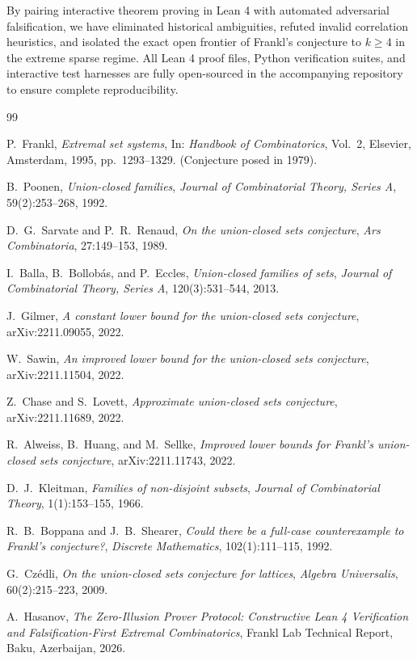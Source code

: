\documentclass[11pt,a4paper]{article}
\theoremstyle{plain}
\theoremstyle{definition}
\theoremstyle{remark}
\begin{document}
By pairing interactive theorem proving in Lean 4 with automated adversarial falsification, we have eliminated historical ambiguities, refuted invalid correlation heuristics, and isolated the exact open frontier of Frankl's conjecture to $k \ge 4$ in the extreme sparse regime. All Lean 4 proof files, Python verification suites, and interactive test harnesses are fully open-sourced in the accompanying repository to ensure complete reproducibility.

\begin{thebibliography}{99}

P.~Frankl,
\newblock \emph{Extremal set systems},
\newblock In: \emph{Handbook of Combinatorics}, Vol.~2, Elsevier, Amsterdam, 1995, pp.~1293--1329. (Conjecture posed in 1979).

B.~Poonen,
\newblock \emph{Union-closed families},
\newblock \emph{Journal of Combinatorial Theory, Series A}, 59(2):253--268, 1992.

D.~G.~Sarvate and P.~R.~Renaud,
\newblock \emph{On the union-closed sets conjecture},
\newblock \emph{Ars Combinatoria}, 27:149--153, 1989.

I.~Balla, B.~Bollob\'as, and P.~Eccles,
\newblock \emph{Union-closed families of sets},
\newblock \emph{Journal of Combinatorial Theory, Series A}, 120(3):531--544, 2013.

J.~Gilmer,
\newblock \emph{A constant lower bound for the union-closed sets conjecture},
\newblock arXiv:2211.09055, 2022.

W.~Sawin,
\newblock \emph{An improved lower bound for the union-closed sets conjecture},
\newblock arXiv:2211.11504, 2022.

Z.~Chase and S.~Lovett,
\newblock \emph{Approximate union-closed sets conjecture},
\newblock arXiv:2211.11689, 2022.

R.~Alweiss, B.~Huang, and M.~Sellke,
\newblock \emph{Improved lower bounds for Frankl's union-closed sets conjecture},
\newblock arXiv:2211.11743, 2022.

D.~J.~Kleitman,
\newblock \emph{Families of non-disjoint subsets},
\newblock \emph{Journal of Combinatorial Theory}, 1(1):153--155, 1966.

R.~B.~Boppana and J.~B.~Shearer,
\newblock \emph{Could there be a full-case counterexample to Frankl's conjecture?},
\newblock \emph{Discrete Mathematics}, 102(1):111--115, 1992.

G.~Cz\'edli,
\newblock \emph{On the union-closed sets conjecture for lattices},
\newblock \emph{Algebra Universalis}, 60(2):215--223, 2009.

A.~Hasanov,
\newblock \emph{The Zero-Illusion Prover Protocol: Constructive Lean 4 Verification and Falsification-First Extremal Combinatorics},
\newblock Frankl Lab Technical Report, Baku, Azerbaijan, 2026.

\end{thebibliography}
\end{document}
